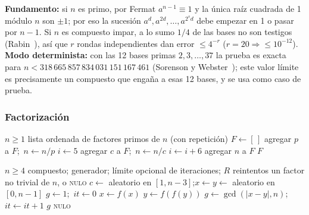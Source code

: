 \noindent\textbf{Fundamento:} si $n$ es primo, por Fermat $a^{n-1}\equiv 1$ y la
única raíz cuadrada de 1 módulo $n$ son $\pm 1$; por eso la sucesión
$a^d, a^{2d}, \dots, a^{2^s d}$ debe empezar en 1 o pasar por $n-1$. Si $n$ es
compuesto impar, a lo sumo $1/4$ de las bases no son testigos
(Rabin~\cite{rabin1980}), así que $r$ rondas independientes dan error
$\le 4^{-r}$ ($r = 20 \Rightarrow \le 10^{-12}$). \textbf{Modo determinista:}
con las 12 bases primas $2, 3, \dots, 37$ la prueba es exacta para
$n < 318\,665\,857\,834\,031\,151\,167\,461$ (Sorenson y
Webster~\cite{sorenson2017}); este valor límite es precisamente un compuesto que
engaña a esas 12 bases, y se usa como caso de prueba.

\subsubsection{Factorización}

\begin{algorithm}[H]
\caption{\textsc{FactorizarPorDivisión}$(n)$ \hfill exacto}
\begin{algorithmic}[1]
\Require $n \ge 1$
\Ensure lista ordenada de factores primos de $n$ (con repetición)
\State $F \gets [\,]$
   \State agregar $p$ a $F$;\ $n \gets n / p$ \EndWhile
\EndFor
\State $i \gets 5$
     \State agregar $c$ a $F$;\ $n \gets n / c$ \EndWhile
  \EndFor
  \State $i \gets i + 6$
\EndWhile
{} agregar $n$ a $F$  \EndIf
\State \Return $F$
\end{algorithmic}
\end{algorithm}

\begin{algorithm}[H]
\caption{\textsc{PollardRho}$(n, \mathit{rng}, \mathit{maxIter}, R)$ \hfill Floyd}
\label{alg:rho}
\begin{algorithmic}[1]
\Require $n \ge 4$ compuesto; generador; límite opcional de iteraciones; $R$ reintentos
\Ensure un factor no trivial de $n$, o \textsc{nulo}
  \EndIf
{}
  \State $c \gets$ aleatorio en $[1, n-3]$;\quad $x \gets y \gets$ aleatorio en $[0, n-1]$
  \State $g \gets 1$;\ $\mathit{it} \gets 0$ 
    \State $x \gets f(x)$ 
    \State $y \gets f(f(y))$ 
    \State $g \gets \gcd(|x - y|, n)$;\ $\mathit{it} \gets \mathit{it} + 1$
     \Break \EndIf
  \EndWhile
   \Return $g$ \EndIf {}
\EndFor
\State \Return \textsc{nulo}
\end{algorithmic}
\end{algorithm}

